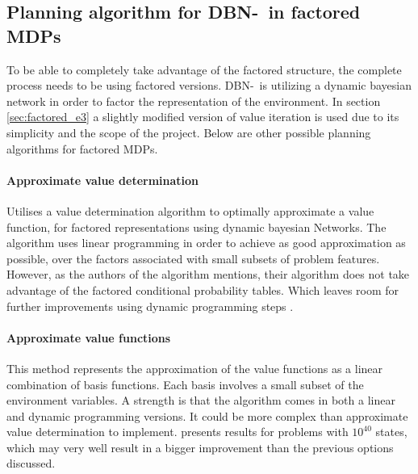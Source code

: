\subsection{Planning algorithm for DBN-\etre\ in factored MDPs}
\label{sec:better_planing_algos}

To be able to completely take advantage of the factored structure, the complete
process needs to be using factored versions. DBN-\etre\ is utilizing a dynamic
bayesian network in order to factor the representation of the environment. In
section \ref{sec:factored_e3} a slightly modified version of value iteration is
used due to its simplicity and the scope of the project. Below are other
possible planning algorithms for factored MDPs.

\paragraph{Approximate value determination}

Utilises a value determination algorithm to optimally approximate a value
function, for factored representations using dynamic bayesian Networks. The
algorithm uses linear programming in order to achieve as good approximation
as possible, over the factors associated with small subsets of problem
features. However, as the authors of the algorithm mentions, their algorithm
does not take advantage of the factored conditional probability tables. Which
leaves room for further improvements using dynamic programming steps
\parencite{koller1999computing}.

\paragraph{Approximate value functions}

This method represents the approximation of the value functions as a linear
combination of basis functions. Each basis involves a small subset of the
environment variables. A strength is that the algorithm comes in both a linear
and dynamic programming versions. It could be more complex than approximate
value determination to implement. \textcite{guestrin2003efficient} presents
results for problems with $10^{40}$ states, which may very well result in a
bigger improvement than the previous options discussed.
